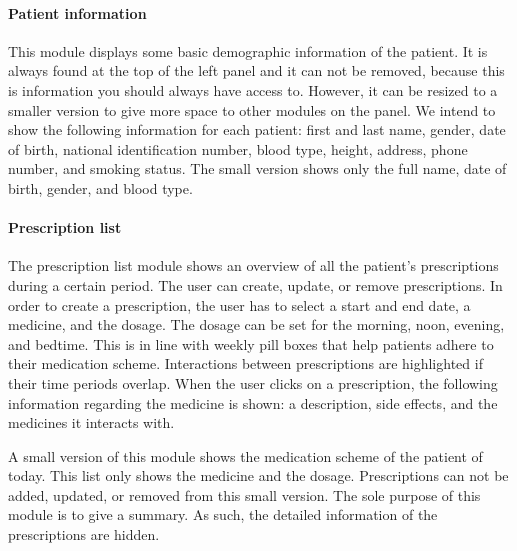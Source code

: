         \paragraph{Patient information} This module displays some basic demographic information of the patient. It is always found at the top of the left panel and it can not be removed, because this is information you should always have access to. However, it can be resized to a smaller version to give more space to other modules on the panel. We intend to show the following information for each patient: first and last name, gender, date of birth, national identification number, blood type, height, address, phone number, and smoking status. The small version shows only the full name, date of birth, gender, and blood type.

        \paragraph{Prescription list} The prescription list module shows an overview of all the patient's prescriptions during a certain period. The user can create, update, or remove prescriptions. In order to create a prescription, the user has to select a start and end date, a medicine, and the dosage. The dosage can be set for the morning, noon, evening, and bedtime. This is in line with weekly pill boxes that help patients adhere to their medication scheme. Interactions between prescriptions are highlighted if their time periods overlap. When the user clicks on a prescription, the following information regarding the medicine is shown: a description, side effects, and the medicines it interacts with.

        A small version of this module shows the medication scheme of the patient of today. This list only shows the medicine and the dosage. Prescriptions can not be added, updated, or removed from this small version. The sole purpose of this module is to give a summary. As such, the detailed information of the prescriptions are hidden.

